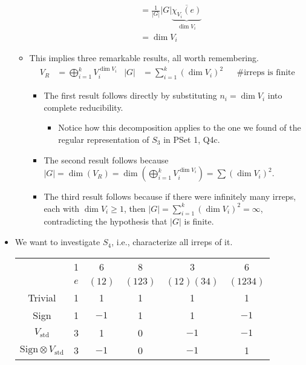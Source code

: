 \documentclass[../notes.tex]{subfiles}
\begin{document}
\begin{itemize}
\begin{itemize}
\begin{align*}
            &= \frac{1}{|G|}|G|\underbrace{\overline{\chi_{V_i}(e)}}_{\dim V_i}\tag*{Corollary 3}\\
            &= \dim V_i
        \end{align*}
        \item This implies three remarkable results, all worth remembering.
        \begin{align*}
            V_R &= \bigoplus_{i=1}^kV_i^{\dim V_i}&
            |G| &= \sum_{i=1}^k(\dim V_i)^2&
            &\text{\# irreps is finite}
        \end{align*}
        \begin{itemize}
            \item The first result follows directly by substituting $n_i=\dim V_i$ into complete reducibility.
            \begin{itemize}
                \item Notice how this decomposition applies to the one we found of the regular representation of $S_3$ in PSet 1, Q4c.
            \end{itemize}
            \item The second result follows because $|G|=\dim(V_R)=\dim(\bigoplus_{i=1}^kV_i^{\dim V_i})=\sum(\dim V_i)^2$.
            \item The third result follows because if there were infinitely many irreps, each with $\dim V_i\geq 1$, then $|G|=\sum_{i=1}^k(\dim V_i)^2=\infty$, contradicting the hypothesis that $|G|$ is finite.
        \end{itemize}
    \end{itemize}
    \item We want to investigate $S_4$, i.e., characterize all irreps of it.
    \begin{table}[h!]
        \centering
        \small
        \renewcommand{\arraystretch}{1.2}
        \begin{tabular}{c|c|c|c|c|c|}
             & 1 & 6 & 8 & 3 & 6\\
             & $e$ & $(12)$ & $(123)$ & $(12)(34)$ & $(1234)$\\ \hline
            Trivial & 1 & 1 & 1 & 1 & 1\\ \hline
            Sign & 1 & $-1$ & 1 & 1 & $-1$\\ \hline
            $V_\text{std}$ & 3 & 1 & 0 & $-1$ & $-1$\\ \hline
            $\text{Sign}\otimes V_\text{std}$ & 3 & $-1$ & 0 & $-1$ & 1\\ \hline

\end{tabular}
\end{table}
\end{itemize}
\end{document}
